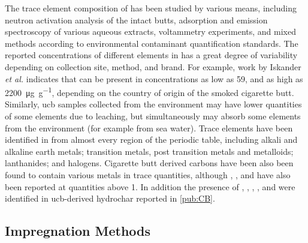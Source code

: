 The trace element composition of  has been studied by various means, including neutron activation analysis of the intact butts,\citep{iskander1992multielement, Iskander1985, jenkins1985neutron, Wu1997} \gls{adsorption} and emission spectroscopy of various aqueous extracts,\citep{MussaloRauhamaa1986, Kazi2009, Moriwaki2009, Moerman2011, Pelit2013, Dobaradaran2018} voltammetry experiments,\citep{Nitsch1991, Kalcher1993} and mixed methods according to environmental contaminant quantification standards.\citep{cardoso2018exposure} The reported concentrations of different elements in  has a great degree of variability depending on collection site, method, and brand. For example, work by Iskander \textit{et al.} indicates that  can be present in concentrations as low as \num{59}, and as high as \qty{2200}{\micro\gram\per\gram}, depending on the country of origin of the smoked cigarette butt. Similarly, \acrshort{ucb} samples collected from the environment\citep{Dobaradaran2017, Moriwaki2009, Moerman2011, chevalier2018nano} may have lower quantities of some elements due to leaching, but simultaneously may absorb some elements from the environment (for example from sea water). Trace elements have been identified in  from almost every region of the periodic table, including alkali and alkaline earth metals;\cite{MussaloRauhamaa1986, Iskander1985, iskander1992multielement, jenkins1985neutron, Wu1997, cardoso2018exposure}  transition metals, post transition metals and metalloids;\citep{MussaloRauhamaa1986, Dobaradaran2017, Iskander1985, jenkins1985neutron, Wu1997, Moriwaki2009, Moerman2011, Pelit2013, Dobaradaran2018, Ren2017, cardoso2018exposure, chevalier2018nano} lanthanides;\citep{iskander1992multielement} and halogens.\citep{Iskander1985, iskander1992multielement, jenkins1985neutron, Wu1997} Cigarette butt derived carbons have been also been found to contain various metals in trace quantities,\citep{Soltani, Soltani2013, Yazdi2012} although , , and  have also been reported at quantities above \qty{1}{\wtpercent}.\citep{Soltani, Soltani2013, Yazdi2012, lima2018, Lee2014} In addition the presence of , , , , and  were identified in \acrshort{ucb}-derived \gls{hydrochar} reported in \ref{pub:CB}.

\subsection{Impregnation Methods}

